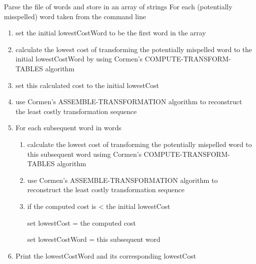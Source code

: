 \documentclass[12pt,letterpaper]{article}
\begin{document}
\begin{small}
    \begin{spverbatim}
    Parse the file of words and store in an array of strings
    For each (potentially misspelled) word taken from the command line
    \end{spverbatim}
    \begin{enumerate}[nosep]
        \item \begin{spverbatim}set the initial lowestCostWord to be the first word in the array\end{spverbatim}
        \item \begin{spverbatim}calculate the lowest cost of transforming the potentially mispelled word to the initial lowestCostWord by using Cormen’s COMPUTE-TRANSFORM-TABLES algorithm\end{spverbatim}
        \item \begin{spverbatim}set this calculated cost to the initial lowestCost\end{spverbatim}
        \item \begin{spverbatim} use Cormen’s ASSEMBLE-TRANSFORMATION algorithm to reconstruct the least costly transformation sequence\end{spverbatim}
        \item \begin{spverbatim}For each subsequent word in words\end{spverbatim}
            \begin{enumerate}
                \item \begin{spverbatim}calculate the lowest cost of transforming the potentially mispelled word to this subsequent word usimg Cormen’s COMPUTE-TRANSFORM-TABLES algorithm\end{spverbatim}
                \item \begin{spverbatim} use Cormen’s ASSEMBLE-TRANSFORMATION algorithm to reconstruct the least costly transformation sequence\end{spverbatim}
                \item \begin{spverbatim}if the computed cost is < the initial lowestCost\end{spverbatim}
                    \begin{spverbatim}set lowestCost = the computed cost\end{spverbatim}
                    \begin{spverbatim}set lowestCostWord = this subsequent word\end{spverbatim}
            \end{enumerate}
        \item \begin{spverbatim}Print the lowestCostWord and its corresponding lowestCost\end{spverbatim}
    \end{enumerate}
\end{small}
\end{document}
